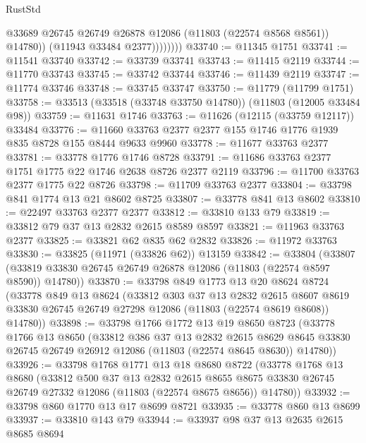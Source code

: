 \begin{lexlean}{RustStd}
\begin{coremodule}
                      @33689
                      @26745
                      @26749
                      @26878
                      @12086
                      (@11803 (@22574 @8568 @8561))
                      @14780))
                  (@11943 @33484 @2377))))))))
@33740 := @11345 @1751
@33741 := @11541 @33740
@33742 := @33739 @33741
@33743 := @11415 @2119
@33744 := @11770 @33743
@33745 := @33742 @33744
@33746 := @11439 @2119
@33747 := @11774 @33746
@33748 := @33745 @33747
@33750 := @11779 (@11799 @1751)
@33758 := @33513 (@33518 (@33748 @33750 @14780)) (@11803 (@12005 @33484 @98))
@33759 := @11631 @1746
@33763 := @11626 (@12115 (@33759 @12117)) @33484
@33776 := @11660 @33763 @2377 @2377 @155 @1746 @1776 @1939 @835 @8728 @155 @8444 @9633 @9960
@33778 := @11677 @33763 @2377
@33781 := @33778 @1776 @1746 @8728
@33791 := @11686 @33763 @2377 @1751 @1775 @22 @1746 @2638 @8726 @2377 @2119
@33796 := @11700 @33763 @2377 @1775 @22 @8726
@33798 := @11709 @33763 @2377
@33804 := @33798 @841 @1774 @13 @21 @8602 @8725
@33807 := @33778 @841 @13 @8602
@33810 := @22497 @33763 @2377 @2377
@33812 := @33810 @133 @79
@33819 := @33812 @79 @37 @13 @2832 @2615 @8589 @8597
@33821 := @11963 @33763 @2377
@33825 := @33821 @62 @835 @62 @2832
@33826 := @11972 @33763
@33830 := @33825 (@11971 (@33826 @62)) @13159
@33842 := @33804
    (@33807 (@33819 @33830 @26745 @26749 @26878 @12086 (@11803 (@22574 @8597 @8590)) @14780))
@33870 := @33798
    @849
    @1773
    @13
    @20
    @8624
    @8724
    (@33778
      @849
      @13
      @8624
      (@33812
        @303
        @37
        @13
        @2832
        @2615
        @8607
        @8619
        @33830
        @26745
        @26749
        @27298
        @12086
        (@11803 (@22574 @8619 @8608))
        @14780))
@33898 := @33798
    @1766
    @1772
    @13
    @19
    @8650
    @8723
    (@33778
      @1766
      @13
      @8650
      (@33812
        @386
        @37
        @13
        @2832
        @2615
        @8629
        @8645
        @33830
        @26745
        @26749
        @26912
        @12086
        (@11803 (@22574 @8645 @8630))
        @14780))
@33926 := @33798
    @1768
    @1771
    @13
    @18
    @8680
    @8722
    (@33778
      @1768
      @13
      @8680
      (@33812
        @500
        @37
        @13
        @2832
        @2615
        @8655
        @8675
        @33830
        @26745
        @26749
        @27332
        @12086
        (@11803 (@22574 @8675 @8656))
        @14780))
@33932 := @33798 @860 @1770 @13 @17 @8699 @8721
@33935 := @33778 @860 @13 @8699
@33937 := @33810 @143 @79
@33944 := @33937 @98 @37 @13 @2635 @2615 @8685 @8694

\end{coremodule}
\end{lexlean}
